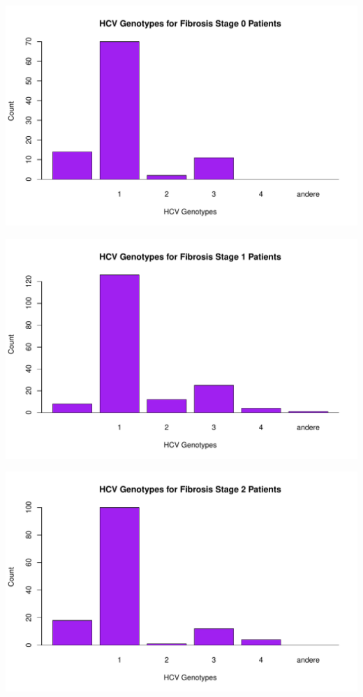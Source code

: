 \documentclass{article}
\begin{document}
\includegraphics{HW0-025}

\includegraphics{HW0-026}

\includegraphics{HW0-027}
\end{document}
